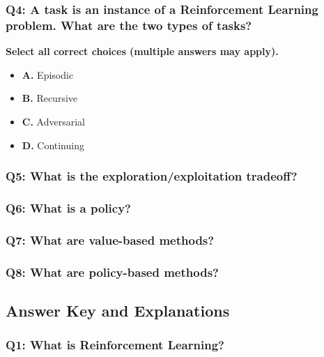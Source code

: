 \documentclass[11pt,a4paper]{article}
\begin{document}
\subsubsection{Q4: A task is an instance of a Reinforcement Learning problem. What are the two types of tasks?}\label{q4-a-task-is-an-instance-of-a-reinforcement-learning-problem.-what-are-the-two-types-of-tasks}

\textbf{Select all correct choices (multiple answers may apply).}

\begin{itemize}
\tightlist
\item
  \textbf{A.} Episodic
\item
  \textbf{B.} Recursive
\item
  \textbf{C.} Adversarial
\item
  \textbf{D.} Continuing
\end{itemize}

\subsubsection{Q5: What is the exploration/exploitation tradeoff?}\label{q5-what-is-the-explorationexploitation-tradeoff}

\subsubsection{Q6: What is a policy?}\label{q6-what-is-a-policy}

\subsubsection{Q7: What are value-based methods?}\label{q7-what-are-value-based-methods}

\subsubsection{Q8: What are policy-based methods?}\label{q8-what-are-policy-based-methods}

\subsection{Answer Key and Explanations}\label{answer-key-and-explanations}

\subsubsection{Q1: What is Reinforcement Learning?}\label{q1-what-is-reinforcement-learning-1}
\end{document}
